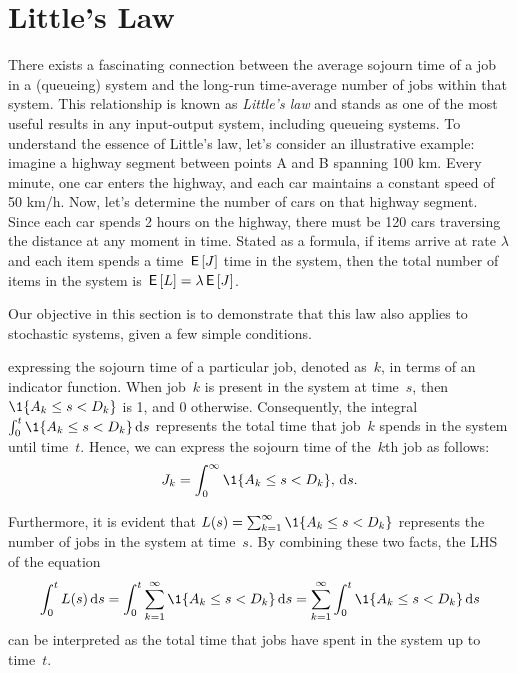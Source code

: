 \documentclass[queueing-book.tex]{subfiles}
\begin{document}
\section{Little's Law}
\label{sec:littles-law}

There exists a fascinating connection between the average sojourn time of a job in a (queueing) system and the long-run time-average number of jobs within that system.
This relationship is known as \emph{Little's law} and stands as one of the most useful results in any input-output system, including queueing systems.
To understand the essence of Little's law, let's consider an illustrative example: imagine a highway segment between points A and B spanning 100 km.
Every minute, one car enters the highway, and each car maintains a constant speed of 50 km/h.
Now, let's determine the number of cars on that highway segment.
Since each car spends 2 hours on the highway,  there must be 120 cars traversing the distance at any moment in time.
Stated as a formula, if items arrive at rate $\lambda$ and each item spends a time $\,\mathsf{E}\left[J\right]$ time in the system, then the total number of items in the system is $\,\mathsf{E}\left[L\right] = \lambda \,\mathsf{E}\left[J\right]$.

Our objective in this section is to demonstrate that this law also applies to stochastic systems, given a few simple conditions.


 expressing the sojourn time of a particular job, denoted as~$k$, in terms of an indicator function.
When job~$k$ is present in the system at time~$s$, then $\1{A_{k}\leq s < D_{k}}$ is 1, and 0 otherwise.
Consequently, the integral $\int_{0}^{t} \1{A_{k}\leq s < D_{k}} \d s$ represents the total time that job~$k$ spends in the system until time~$t$.
Hence, we can express the sojourn time of the~$k$th job as follows:
\begin{equation*}
\J_k = \int_0^\infty \1{A_k \leq s < D_k},\d s.
\end{equation*}


Furthermore, it is evident that $\L(s) = \sum_{k=1}^\infty \1{A_k \leq s < D_k}$ represents the number of jobs in the system at time~$s$.
By combining these two facts, the LHS of the equation
\begin{equation}\label{eq:little:2}
\int_{0}^{t}\L(s) \d s = \int_{0}^{t }\sum_{k=1}^\infty \1{A_k \leq s < D_k} \d s = \sum_{k=1}^\infty \int_{0}^{t }\1{A_k \leq s < D_k} \d s
\end{equation}
can be interpreted as the total time that jobs have spent in the system up to time~$t$.
\end{document}
